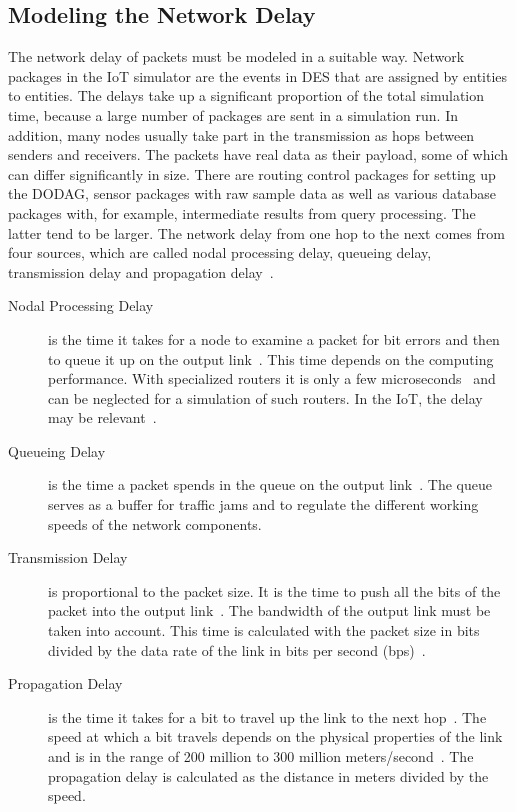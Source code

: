 \documentclass[english,version-2019-11]{uzl-thesis}
\begin{document}
\subsection{Modeling the Network Delay}
The network delay of packets must be modeled in a suitable way. Network packages in the IoT simulator are the events in DES that are assigned by entities to entities. The delays take up a significant proportion of the total simulation time, because a large number of packages are sent in a simulation run. In addition, many nodes usually take part in the transmission as hops between senders and receivers. The packets have real data as their payload, some of which can differ significantly in size. There are routing control packages for setting up the DODAG, sensor packages with raw sample data as well as various database packages with, for example, intermediate results from query processing. The latter tend to be larger.
The network delay from one hop to the next comes from four sources, which are called nodal processing delay, queueing delay, transmission delay and propagation delay~\cite{Kurose}.
\begin{description}
 \item [Nodal Processing Delay] is the time it takes for a node to examine a packet for bit errors and then to queue it up on the output link~\cite{Kurose}. This time depends on the computing performance. With specialized routers it is only a few microseconds~\cite{Kurose} and can be neglected for a simulation of such routers. In the IoT, the delay may be relevant~\cite{RPLEndToEndEstimation}.
 \item [Queueing Delay] is the time a packet spends in the queue on the output link~\cite{Kurose}. The queue serves as a buffer for traffic jams and to regulate the different working speeds of the network components.
  \item [Transmission Delay] is proportional to the packet size. It is the time to push all the bits of the packet into the output link~\cite{Kurose}. The bandwidth of the output link must be taken into account. This time is calculated with the packet size in bits divided by the data rate of the link in bits per second (bps)~\cite{Kurose}.
  \item [Propagation Delay] is the time it takes for a bit to travel up the link to the next hop~\cite{Kurose}. The speed at which a bit travels depends on the physical properties of the link and is in the range of 200 million to 300 million meters/second~\cite{Kurose}. The propagation delay is calculated as the distance in meters divided by the speed.
\end{description}
\end{document}
